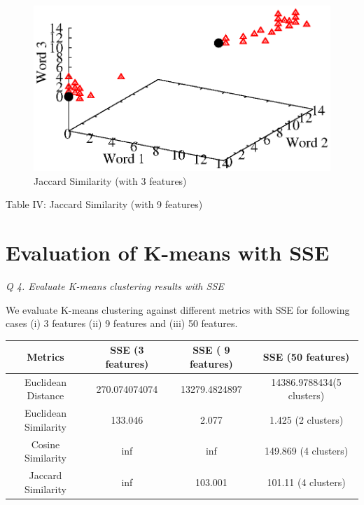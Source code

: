 \documentclass[journal,onecolumn]{IEEEtran}
\begin{document}
{\begin{figure}[h] \label{jaccard_sim}
\begin{center}
 \includegraphics[scale=.70] {Plots/jaccard_sim.eps}
 \caption { Jaccard Similarity (with 3 features)}
 \end{center}
\end{figure}

{Table IV: Jaccard Similarity (with 9 features) \label{jaccard_sim_10}}

\section{Evaluation of K-means with SSE}
\textit{Q 4. Evaluate K-means clustering results with SSE}

We evaluate K-means clustering against different metrics with SSE for following cases (i) 3 features (ii) 9 features and (iii) 50 features.

\begin{table}[h]
\begin{center}
\begin{tabular}{|c|c|c|c| } 

\hline %
Metrics & SSE (3 features) & SSE ( 9  features) & SSE (50 features)\\
\hline
Euclidean Distance & 270.074074074 & 13279.4824897 & 14386.9788434(5 clusters) \\ \hline
Euclidean Similarity & 133.046 & 2.077 & 1.425 (2 clusters)\\ \hline
Cosine Similarity & inf & inf  & 149.869 (4 clusters)\\ \hline
Jaccard Similarity & inf & 103.001 & 101.11 (4 clusters) \\ \hline


\end{tabular}
\end{center}
\end{table}}
\end{document}
